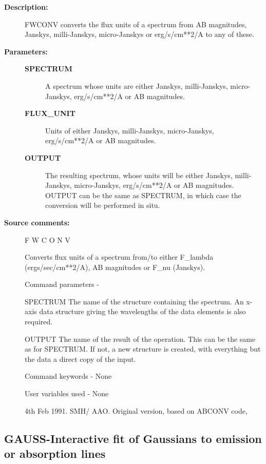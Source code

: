 \begin{description}
\begin{description}
\item [\textbf{Description:}]
 FWCONV converts the flux units of a spectrum from AB magnitudes,
 Janskys, milli-Janskys, micro-Janskys or erg/s/cm**2/A to any of
 these.

\item [\textbf{Parameters:}]
\begin{description}
\item [\textbf{SPECTRUM}]
 A spectrum whose units are either Janskys,
 milli-Janskys, micro-Janskys, erg/s/cm**2/A
 or AB magnitudes.
\item [\textbf{FLUX\_UNIT}]
 Units of either Janskys, milli-Janskys,
 micro-Janskys, erg/s/cm**2/A or AB magnitudes.
\item [\textbf{OUTPUT}]
 The resulting spectrum, whose units will be either
 Janskys, milli-Janskys, micro-Janskys, erg/s/cm**2/A or
 AB magnitudes.  OUTPUT can be the same as SPECTRUM, in which
 case the conversion will be performed in situ.
\end{description}

\item [\textbf{Source comments:}]
\begin{terminalv}
 F W C O N V

 Converts flux units of a spectrum from/to either
 F_lambda (ergs/sec/cm**2/A), AB magnitudes or F_nu (Janskys).

 Command parameters -

 SPECTRUM The name of the structure containing the spectrum.
          An x-axis data structure giving the wavelengths of the
          data elements is also required.

 OUTPUT   The name of the result of the operation.  This can
          be the same as for SPECTRUM. If not, a new structure
          is created, with everything but the data a direct
          copy of the input.

 Command keywords  - None

 User variables used - None

 4th  Feb 1991.  SMH/ AAO.  Original version, based on ABCONV code,
\end{terminalv}
\end{description}
\subsection{GAUSS-\label{GAUSS}Interactive fit of Gaussians to emission or absorption lines}
\begin{description}


\end{description}
\end{description}
